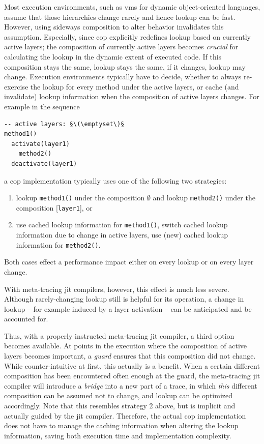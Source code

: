 \documentclass[preprint,english,10pt,nonatbib]{sigplanconf}
\begin{document}
Most execution environments, such as \acp{vm} for dynamic object-oriented
languages, assume that those hierarchies change rarely and hence lookup can be
fast. However, using sideways composition to alter behavior invalidates this
assumption. Especially, since \ac{cop} explicitly redefines lookup based on
currently active layers; the composition of currently active layers becomes
\emph{crucial} for calculating the lookup in the dynamic extent of executed
code. If this composition stays the same, lookup stays the same, if it changes,
lookup may change. Execution environments typically have to decide, whether to
always re-exercise the lookup for every method under the active layers, or
cache (and invalidate) lookup information when the composition of active layers
changes. For example in the sequence
\begin{lstlisting}
-- active layers: §\(\emptyset\)§
method1()
  activate(layer1)
    method2()
  deactivate(layer1)
\end{lstlisting}
a \ac{cop} implementation typically uses one of the following two strategies:
\begin{enumerate}
\item lookup \lstinline|method1()| under the composition
  \(\emptyset\)
  and lookup \lstinline|method2()| under the composition
  [\lstinline|layer1|], or
\item use cached lookup information for \lstinline|method1()|, switch cached
  lookup information due to change in active layers, use (new) cached lookup
  information for \lstinline|method2()|.
\end{enumerate}
Both cases effect a performance impact either on every lookup or on every
layer change.

With meta-tracing \ac{jit} compilers, however, this effect is much less
severe. Although rarely-changing lookup still is helpful for its operation, a
change in lookup \--- for example induced by a layer activation \--- can be
anticipated and be accounted for.

Thus, with a properly instructed meta-tracing \ac{jit} compiler, a third option
becomes available. At points in the execution where the composition of active
layers becomes important, a \emph{guard} ensures that this composition did not
change. While counter-intuitive at first, this actually is a benefit. When a
certain different composition has been encountered often enough at the guard,
the meta-tracing \ac{jit} compiler will introduce a \emph{bridge} into a new
part of a trace, in which \emph{this} different composition can be assumed not
to change, and lookup can be optimized accordingly. Note that this resembles
strategy 2 above, but is implicit and actually guided by the \ac{jit} compiler.
Therefore, the actual \ac{cop} implementation does not have to manage the
caching information when altering the lookup information, saving both execution
time and implementation complexity.
\end{document}
